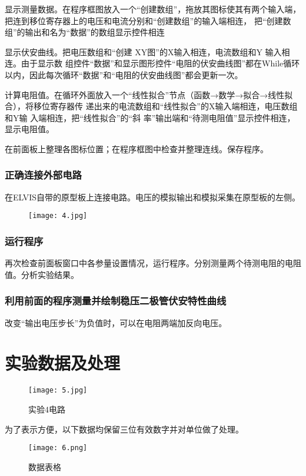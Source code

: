\documentclass[12pt,a4paper]{article}
\begin{document}
    显示测量数据。在程序框图放入一个“创建数组”，拖放其图标使其有两个输入端，把连到移位寄存器上的电压和电流分别和“创建数组”的输入端相连，
    把“创建数组”的输出和名为“数据”的数组显示控件相连

    显示伏安曲线。把电压数组和“创建 XY图”的X输入相连，电流数组和Y 输入相连。由于显示数
    组控件“数据”和显示图形控件“电阻的伏安曲线图”都在While循环以内，因此每次循环“数据”和“电阻的伏安曲线图”都会更新一次。

    计算电阻值。在循环外面放入一个“线性拟合”节点（函数→数学→拟合→线性拟合），将移位寄存器传
    递出来的电流数组和“线性拟合”的X输入端相连，电压数组和Y输 入端相连，把“线性拟合”的“斜
    率”输出端和“待测电阻值”显示控件相连，显示电阻值。

    在前面板上整理各图标位置；在程序框图中检查并整理连线。保存程序。

    \subsubsection{正确连接外部电路}
    在ELVIS自带的原型板上连接电路。电压的模拟输出和模拟采集在原型板的左侧。
    \begin{figure}[H]
        \centering
        \texttt{[image: 4.jpg]}
    \end{figure}
    \subsubsection{运行程序}
    再次检查前面板窗口中各参量设置情况，运行程序。分别测量两个待测电阻的电阻值。分析实验结果。

    \subsubsection{利用前面的程序测量并绘制稳压二极管伏安特性曲线}
    改变“输出电压步长”为负值时，可以在电阻两端加反向电压。

\section{实验数据及处理}
\begin{figure}[H]
    \centering
    \caption{实验4电路}
    \texttt{[image: 5.jpg]}
\end{figure}
    为了表示方便，以下数据均保留三位有效数字并对单位做了处理。

\begin{figure}[H]
        \centering
        \caption{数据表格}
        \texttt{[image: 6.png]}
\end{figure}
\end{document}
